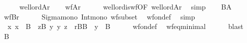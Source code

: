 \begin{isabellebody}
%
\isadelimproof
%
\endisadelimproof
%
\isatagproof
{}\isamarkupfalse%
\ {\isacharminus}{\kern0pt}\isanewline
\ \ \isamarkupfalse%
\ {\isacartoucheopen}well{\isacharunderscore}{\kern0pt}ord{\isacharparenleft}{\kern0pt}A{\isacharcomma}{\kern0pt}r{\isacharparenright}{\kern0pt}{\isacartoucheclose}\isanewline
\ \ \isamarkupfalse%
\ {\isachardoublequoteopen}wf{\isacharbrackleft}{\kern0pt}A{\isacharbrackright}{\kern0pt}{\isacharparenleft}{\kern0pt}r{\isacharparenright}{\kern0pt}{\isachardoublequoteclose}\isanewline
\ \ \ \ \isamarkupfalse%
\ well{\isacharunderscore}{\kern0pt}ord{\isacharunderscore}{\kern0pt}is{\isacharunderscore}{\kern0pt}wf{\isacharbrackleft}{\kern0pt}OF\ {\isacartoucheopen}well{\isacharunderscore}{\kern0pt}ord{\isacharparenleft}{\kern0pt}A{\isacharcomma}{\kern0pt}r{\isacharparenright}{\kern0pt}{\isacartoucheclose}{\isacharbrackright}{\kern0pt}\ \isamarkupfalse%
\ simp\isanewline
\ \ \isamarkupfalse%
\ {\isacartoucheopen}B{\isasymsubseteq}A{\isacartoucheclose}\isanewline
\ \ \isamarkupfalse%
\ {\isachardoublequoteopen}wf{\isacharbrackleft}{\kern0pt}B{\isacharbrackright}{\kern0pt}{\isacharparenleft}{\kern0pt}r{\isacharparenright}{\kern0pt}{\isachardoublequoteclose}\isanewline
\ \ \ \ \isamarkupfalse%
\ Sigma{\isacharunderscore}{\kern0pt}mono\ Int{\isacharunderscore}{\kern0pt}mono\ wf{\isacharunderscore}{\kern0pt}subset\ \isamarkupfalse%
\ wf{\isacharunderscore}{\kern0pt}on{\isacharunderscore}{\kern0pt}def\ \isamarkupfalse%
\ simp\isanewline
\ \ \isamarkupfalse%
\isanewline
\ \ \isamarkupfalse%
\ {\isachardoublequoteopen}{\isasymforall}\ x{\isachardot}{\kern0pt}\ x\ {\isasymin}\ B\ {\isasymlongrightarrow}\ {\isacharparenleft}{\kern0pt}{\isasymexists}z{\isasymin}B{\isachardot}{\kern0pt}\ {\isasymforall}y{\isachardot}{\kern0pt}\ {\isasymlangle}y{\isacharcomma}{\kern0pt}\ z{\isasymrangle}\ {\isasymin}\ r{\isasyminter}B{\isasymtimes}B\ {\isasymlongrightarrow}\ y\ {\isasymnotin}\ B{\isacharparenright}{\kern0pt}{\isachardoublequoteclose}\isanewline
\ \ \ \ \isamarkupfalse%
\ wf{\isacharunderscore}{\kern0pt}on{\isacharunderscore}{\kern0pt}def\ \isamarkupfalse%
\ wf{\isacharunderscore}{\kern0pt}eq{\isacharunderscore}{\kern0pt}minimal\isanewline
\ \ \ \ \isamarkupfalse%
\ blast\isanewline
\ \ \isamarkupfalse%
\ {\isacartoucheopen}B{\isasymnoteq}{}{\isacartoucheclose}\isanewline

\end{isabellebody}
